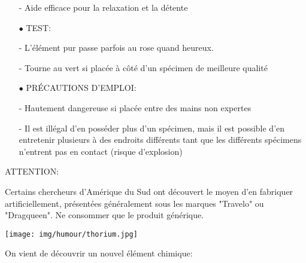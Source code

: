 \begin{itemize}
- Aide efficace pour la relaxation et la détente

	\item[$\bullet$] TEST: 

- L'élément pur passe parfois au rose quand heureux.

- Tourne au vert si placée à côté d'un spécimen de meilleure qualité

	\item[$\bullet$] PRÉCAUTIONS D'EMPLOI:

- Hautement dangereuse si placée entre des mains non expertes

- Il est illégal d'en posséder plus d'un spécimen, mais il est possible d'en entretenir plusieurs à des endroits différents tant que les différents spécimens n'entrent pas en contact (risque d'explosion)

\end{itemize}

ATTENTION: 

Certains chercheurs d'Amérique du Sud ont découvert le moyen d'en fabriquer artificiellement, présentées généralement sous les marques "Travelo" ou "Dragqueen". Ne consommer que le produit générique.

	\begin{center}\underline{\hspace{5 cm}}\end{center}

	\begin{center}
	\texttt{[image: img/humour/thorium.jpg]}
	\end{center}
	
	\begin{center}\underline{\hspace{5 cm}}\end{center}

On vient de découvrir un nouvel élément chimique:

